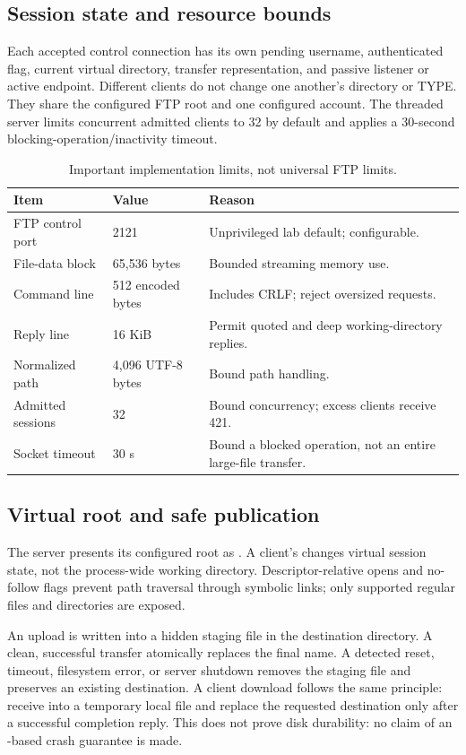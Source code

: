 \subsection{Session state and resource bounds}
Each accepted control connection has its own pending username, authenticated flag, current virtual directory, transfer representation, and passive listener or active endpoint. Different clients do not change one another's directory or TYPE. They share the configured FTP root and one configured account. The threaded server limits concurrent admitted clients to 32 by default and applies a 30-second blocking-operation/inactivity timeout.

\begin{table}[htbp]
\centering\small
\caption{Important implementation limits, not universal FTP limits.}
\begin{tabularx}{\linewidth}{@{}l l Y@{}}
\toprule
Item & Value & Reason \\
\midrule
FTP control port & 2121 & Unprivileged lab default; configurable. \\
File-data block & 65,536 bytes & Bounded streaming memory use. \\
Command line & 512 encoded bytes & Includes CRLF; reject oversized requests. \\
Reply line & 16 KiB & Permit quoted and deep working-directory replies. \\
Normalized path & 4,096 UTF-8 bytes & Bound path handling. \\
Admitted sessions & 32 & Bound concurrency; excess clients receive 421. \\
Socket timeout & 30 s & Bound a blocked operation, not an entire large-file transfer. \\
\bottomrule
\end{tabularx}
\end{table}

\subsection{Virtual root and safe publication}
The server presents its configured root as \code{/}. A client's  changes virtual session state, not the process-wide working directory. Descriptor-relative opens and no-follow flags prevent path traversal through symbolic links; only supported regular files and directories are exposed.

An upload is written into a hidden staging file in the destination directory. A clean, successful transfer atomically replaces the final name. A detected reset, timeout, filesystem error, or server shutdown removes the staging file and preserves an existing destination. A client download follows the same principle: receive into a temporary local file and replace the requested destination only after a successful completion reply. This does not prove disk durability: no claim of an -based crash guarantee is made.

